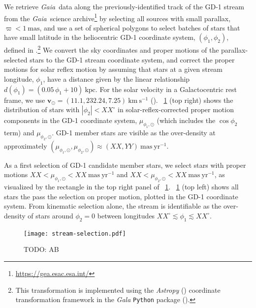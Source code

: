 \documentclass[modern]{aastex62}
\newcommand{\package}[1]{\textsl{#1}}
\newcommand{\gaia}{\textsl{Gaia}}
\newcommand{\kms}{\ensuremath{\textrm{km}~\textrm{s}^{-1}}}
\newcommand{\bs}[1]{\boldsymbol{#1}}
\newcommand{\masyr}{\ensuremath{\textrm{mas}~\textrm{yr}^{-1}}}
\newcommand{\todo}[1]{{\color{red} TODO: #1}}
\begin{document}

We retrieve \gaia\ data along the previously-identified track of the GD-1 stream
from the \gaia\ science archive\footnote{\url{https://gea.esac.esa.int/}} by
selecting all sources with small parallax, $\varpi < 1~\textrm{mas}$, and use a
set of spherical polygons to select batches of stars that have small latitude in
the heliocentric GD-1 coordinate system, $(\phi_1, \phi_2)$, defined in
\cite{Koposov:2010}.\footnote{This transformation is implemented using the
\package{Astropy} (\citealt{astropy}) coordinate transformation framework in the
\package{Gala} \texttt{Python} package (\citealt{gala}).}
We convert the sky coordinates and proper motions of the parallax-selected stars
to the GD-1 stream coordinate system, and correct the proper motions for solar
reflex motion by assuming that stars at a given stream longitude, $\phi_1$, have
a distance given by the linear relationship $d(\phi_1) = (0.05 \, \phi_1 +
10)~\textrm{kpc}$.
For the solar velocity in a Galactocentric rest frame, we use $\bs{v}_\odot =
(11.1, 232.24, 7.25)~\kms$ (\citealt{Schonrich:2010, Bovy:2015}).
\figurename~\ref{fig:selection} (top right) shows the distribution of stars with
$|\phi_2| < XX^\circ$ in solar-reflex-corrected proper motion components in the
GD-1 coordinate system, $\mu_{\phi_1, \odot}$ (which includes the $\cos{\phi_2}$
term) and $\mu_{\phi_2, \odot}$.
GD-1 member stars are visible as the over-density at approximately
$(\mu_{\phi_1, \odot}, \mu_{\phi_2, \odot}) \approx (XX, YY)~\masyr$.

As a first selection of GD-1 candidate member stars, we select stars with proper
motions $XX < \mu_{\phi_1, \odot} < XX~\masyr$ and $XX < \mu_{\phi_2, \odot} <
XX~\masyr$, as visualized by the rectangle in the top right panel of
\figurename~\ref{fig:selection}.
\figurename~\ref{fig:selection} (top left) shows all stars the pass the
selection on proper motion, plotted in the GD-1 coordinate system.
From kinematic selection alone, the stream is identifiable as the over-density
of stars around $\phi_2 = 0$ between longitudes $XX^\circ \lesssim \phi_1
\lesssim XX^\circ$.

\begin{figure}[h]
\begin{center}
\texttt{[image: stream-selection.pdf]}
\end{center}
\caption{
    \todo{AB}
\label{fig:selection}
}
\end{figure}
\end{document}
